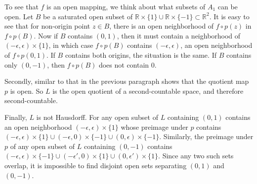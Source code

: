 \documentclass[10pt,letter]{article}
\begin{document}
To see that $f$ is an open mapping, we think about what subsets of $A_1$ can be open. Let $B$ be a saturated open subset of $\mathbb{R} \times \lbrace 1 \rbrace \cup \mathbb{R} \times \lbrace -1 \rbrace \subset \mathbb{R}^2$. It is easy to see that for non-origin point $z \in B$, there is an open neighborhood of $f \circ p(z)$ in $f \circ p(B)$. Now if $B$ contains $(0,1)$, then it must contain a neighborhood of $(-\epsilon,\epsilon) \times \lbrace 1 \rbrace$, in which case $f \circ p(B)$ contains $(-\epsilon,\epsilon)$, an open neighborhood of $f \circ p(0,1)$. If $B$ contains both origins, the situation is the same. If $B$ contains only $(0,-1)$, then $f \circ p(B)$ does not contain $0$. 


Secondly, similar to that in the previous paragraph shows that the quotient map $p$ is open. So $L$ is the open quotient of a second-countable space, and therefore second-countable.

Finally, $L$ is not Hausdorff. For any open subset of $L$ containing $(0,1)$ contains an open neighborhood $(-\epsilon,\epsilon) \times \lbrace 1 \rbrace$ whose preimage under $p$ contains $(-\epsilon,\epsilon) \times \lbrace 1 \rbrace \cup (-\epsilon,0) \times \lbrace -1 \rbrace \cup (0,\epsilon) \times \lbrace -1 \rbrace$. Similarly, the preimage under $p$ of any open subset of $L$ containing $(0,-1)$ contains $(-\epsilon,\epsilon) \times \lbrace -1 \rbrace \cup(-\epsilon',0) \times \lbrace 1 \rbrace \cup (0,\epsilon') \times \lbrace 1 \rbrace$. Since any two such sets overlap, it is impossible to find disjoint open sets separating $(0,1)$ and $(0,-1)$.
\end{document}
